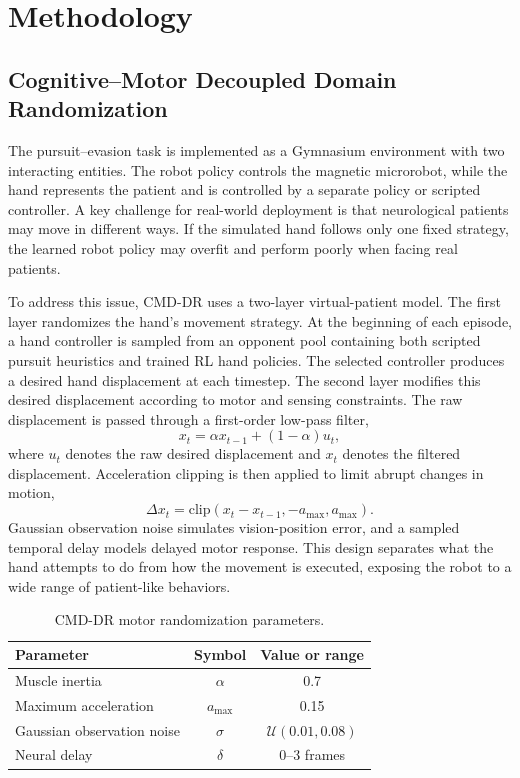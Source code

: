 \documentclass[lettersize,journal]{IEEEtran}
\begin{document}
\section{Methodology}
\subsection{Cognitive--Motor Decoupled Domain Randomization}
The pursuit--evasion task is implemented as a Gymnasium environment with two interacting entities. The robot policy controls the magnetic microrobot, while the hand represents the patient and is controlled by a separate policy or scripted controller. A key challenge for real-world deployment is that neurological patients may move in different ways. If the simulated hand follows only one fixed strategy, the learned robot policy may overfit and perform poorly when facing real patients.

To address this issue, CMD-DR uses a two-layer virtual-patient model. The first layer randomizes the hand's movement strategy. At the beginning of each episode, a hand controller is sampled from an opponent pool containing both scripted pursuit heuristics and trained RL hand policies. The selected controller produces a desired hand displacement at each timestep. The second layer modifies this desired displacement according to motor and sensing constraints. The raw displacement is passed through a first-order low-pass filter,
\begin{equation}
    x_t = \alpha x_{t-1} + (1-\alpha)u_t,
\end{equation}
where $u_t$ denotes the raw desired displacement and $x_t$ denotes the filtered displacement. Acceleration clipping is then applied to limit abrupt changes in motion,
\begin{equation}
    \Delta x_t = \mathrm{clip}(x_t - x_{t-1}, -a_{\max}, a_{\max}).
\end{equation}
Gaussian observation noise simulates vision-position error, and a sampled temporal delay models delayed motor response. This design separates what the hand attempts to do from how the movement is executed, exposing the robot to a wide range of patient-like behaviors.

\begin{table}[!t]
\caption{CMD-DR motor randomization parameters.}
\label{tab:cmd_dr}
\centering
\begin{tabular}{lcc}
\hline
Parameter & Symbol & Value or range \\
\hline
Muscle inertia & $\alpha$ & 0.7 \\
Maximum acceleration & $a_{\max}$ & 0.15 \\
Gaussian observation noise & $\sigma$ & $\mathcal{U}(0.01, 0.08)$ \\
Neural delay & $\delta$ & 0--3 frames \\
\hline
\end{tabular}
\end{table}
\end{document}
